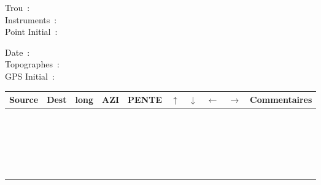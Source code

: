 \documentclass[11pt]{article}
\author{v45h}
\date{\today}
\title{}
\begin{document}
   \begin{minipage}{0.40\linewidth}
     Trou~:\\
     Instruments~:\\
     Point Initial~:
   \end{minipage}\hfill
   \begin{minipage}{0.48\linewidth}   
     Date~:\\
     Topographes~:\\
     GPS Initial~:
\end{minipage}


\begin{center}
\begin{tabular}{|m{1cm}|m{1cm}|m{1cm}|m{1cm}|m{1.2cm}|m{1cm}|m{1cm}|m{1cm}|m{1cm}|m{6cm}|}
\hline
Source & Dest & long & AZI & PENTE & $\uparrow$ & $\downarrow$ & $\leftarrow$ & $\rightarrow$ & Commentaires\\
\hline
 &  &  &  &  &  &  &  &  & \\
\hline
 &  &  &  &  &  &  &  &  & \\
\hline
 &  &  &  &  &  &  &  &  & \\
\hline
 &  &  &  &  &  &  &  &  & \\
\hline
 &  &  &  &  &  &  &  &  & \\
\hline
 &  &  &  &  &  &  &  &  & \\
\hline
 &  &  &  &  &  &  &  &  & \\
\hline
 &  &  &  &  &  &  &  &  & \\
\hline
 &  &  &  &  &  &  &  &  & \\
\hline
 &  &  &  &  &  &  &  &  & \\
\hline
 &  &  &  &  &  &  &  &  & \\
\hline
 &  &  &  &  &  &  &  &  & \\
\hline
 &  &  &  &  &  &  &  &  & \\
\hline
 &  &  &  &  &  &  &  &  & \\
\hline
 &  &  &  &  &  &  &  &  & \\
\hline
 &  &  &  &  &  &  &  &  & \\
\hline
 &  &  &  &  &  &  &  &  & \\
\hline
 &  &  &  &  &  &  &  &  & \\
\hline
 &  &  &  &  &  &  &  &  & \\
\hline
 &  &  &  &  &  &  &  &  & \\
\hline
 &  &  &  &  &  &  &  &  & \\
\hline
 &  &  &  &  &  &  &  &  & \\

\end{tabular}
\end{center}
\end{document}
